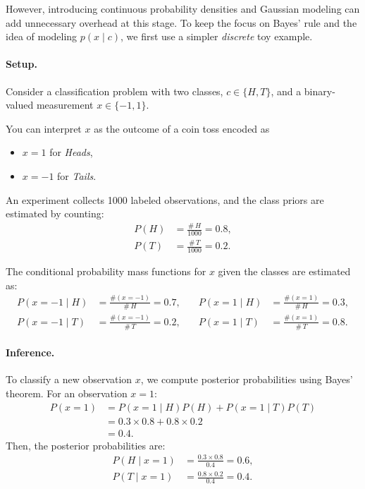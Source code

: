 \documentclass[12pt]{article}
\begin{document}
However, introducing continuous probability densities and Gaussian modeling can add unnecessary overhead at this stage. To keep the focus on Bayes' rule and the idea of modeling $p(x\mid c)$, we first use a simpler \emph{discrete} toy example.

\paragraph{Setup.}
Consider a classification problem with two classes, $c\in\{H, T\}$, and a binary-valued measurement $x\in\{-1, 1\}$.

You can interpret $x$ as the outcome of a coin toss encoded as
\begin{itemize}
    \item $x=1$ for \textit{Heads},
    \item $x=-1$ for \textit{Tails}.
\end{itemize}

An experiment collects 1000 labeled observations, and the class priors are estimated by counting:
\begin{align*}
P(H) &= \frac{\#\,H}{1000} = 0.8, \\
P(T) &= \frac{\#\,T}{1000} = 0.2.
\end{align*}

The conditional probability mass functions for $x$ given the classes are estimated as:
\begin{align*}
P(x=-1 \mid H) &= \frac{\#(x=-1)}{\#\,H} = 0.7, \quad & P(x=1 \mid H) &= \frac{\#(x=1)}{\#\,H} = 0.3, \\
P(x=-1 \mid T) &= \frac{\#(x=-1)}{\#\,T} = 0.2, \quad & P(x=1 \mid T) &= \frac{\#(x=1)}{\#\,T} = 0.8.
\end{align*}

\paragraph{Inference.}
To classify a new observation $x$, we compute posterior probabilities using Bayes' theorem. For an observation $x=1$:
\begin{align*}
P(x=1) &= P(x=1 \mid H)P(H) + P(x=1 \mid T)P(T) \\
       &= 0.3 \times 0.8 + 0.8 \times 0.2 \\
       &= 0.4.
\end{align*}
Then, the posterior probabilities are:
\begin{align*}
P(H \mid x=1) &= \frac{0.3 \times 0.8}{0.4} = 0.6, \\
P(T \mid x=1) &= \frac{0.8 \times 0.2}{0.4} = 0.4.
\end{align*}
\end{document}
